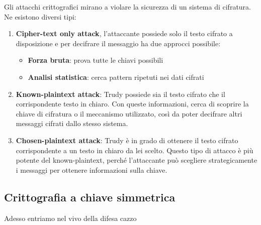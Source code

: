 Gli attacchi crittografici mirano a violare la sicurezza di un sistema di cifratura. Ne esistono diversi tipi:
\begin{enumerate}
    \item \textbf{Cipher-text only attack}, l'attaccante possiede solo il testo cifrato a disposizione e per decifrare il messaggio ha due approcci possibile:
    \begin{itemize}
        \item \textbf{Forza bruta}: prova tutte le chiavi possibili
        \item \textbf{Analisi statistica}: cerca pattern ripetuti nei dati cifrati
    \end{itemize}
    \item \textbf{Known-plaintext attack}: Trudy possiede sia il testo cifrato che il corrispondente testo in chiaro. Con queste informazioni, cerca di scoprire la chiave di cifratura o il meccanismo utilizzato, così da poter decifrare altri messaggi cifrati dallo stesso sistema.


    \item \textbf{Chosen-plaintext attack}: Trudy è in grado di ottenere il testo cifrato corrispondente a un testo in chiaro da lei scelto. Questo tipo di attacco è più potente del known-plaintext, perché l'attaccante può scegliere strategicamente i messaggi per ottenere informazioni sulla chiave.
\end{enumerate}

\subsection{Crittografia a chiave simmetrica}
Adesso entriamo nel vivo della difesa cazzo

